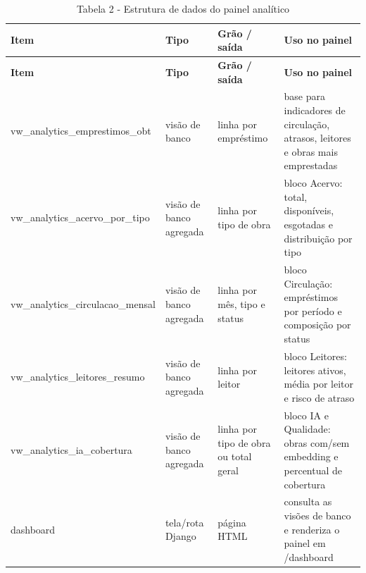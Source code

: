 \documentclass[
]{article}
\begin{document}
\begin{longtable}[]{@{}
  >{\raggedright\arraybackslash}p{}
  >{\raggedright\arraybackslash}p{}
  >{\raggedright\arraybackslash}p{}
  >{\raggedright\arraybackslash}p{}@{}}
\caption{Tabela 2 - Estrutura de dados do painel
analítico}\tabularnewline
\toprule\noalign{}
\begin{minipage}[b]{\linewidth}\raggedright
\textbf{Item}
\end{minipage} & \begin{minipage}[b]{\linewidth}\raggedright
\textbf{Tipo}
\end{minipage} & \begin{minipage}[b]{\linewidth}\raggedright
\textbf{Grão / saída}
\end{minipage} & \begin{minipage}[b]{\linewidth}\raggedright
\textbf{Uso no painel}
\end{minipage} \\
\midrule\noalign{}
\endfirsthead
\toprule\noalign{}
\begin{minipage}[b]{\linewidth}\raggedright
\textbf{Item}
\end{minipage} & \begin{minipage}[b]{\linewidth}\raggedright
\textbf{Tipo}
\end{minipage} & \begin{minipage}[b]{\linewidth}\raggedright
\textbf{Grão / saída}
\end{minipage} & \begin{minipage}[b]{\linewidth}\raggedright
\textbf{Uso no painel}
\end{minipage} \\
\midrule\noalign{}
\endhead
\bottomrule\noalign{}
\endlastfoot
vw\_analytics\_emprestimos\_obt & visão de banco & 1 linha por
empréstimo & base para indicadores de circulação, atrasos, leitores e
obras mais emprestadas \\
vw\_analytics\_acervo\_por\_tipo & visão de banco agregada & 1 linha por
tipo de obra & bloco Acervo: total, disponíveis, esgotadas e
distribuição por tipo \\
vw\_analytics\_circulacao\_mensal & visão de banco agregada & 1 linha
por mês, tipo e status & bloco Circulação: empréstimos por período e
composição por status \\
vw\_analytics\_leitores\_resumo & visão de banco agregada & 1 linha por
leitor & bloco Leitores: leitores ativos, média por leitor e risco de
atraso \\
vw\_analytics\_ia\_cobertura & visão de banco agregada & 1 linha por
tipo de obra ou total geral & bloco IA e Qualidade: obras com/sem
embedding e percentual de cobertura \\
dashboard & tela/rota Django & página HTML & consulta as visões de banco
e renderiza o painel em /dashboard \\
\end{longtable}
\end{document}

